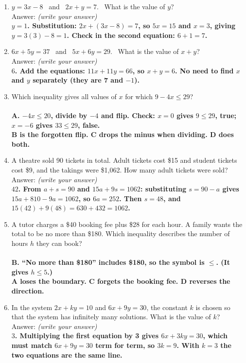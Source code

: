 \documentclass[11pt,a4paper]{article}
\newcommand{\spr}{\\[3pt]\hspace*{6pt}Answer: \underline{\hspace{3.2cm}}\hfill{\footnotesize\itshape(write your answer)}}
\newcommand{\ans}[1]{\ {\color{keyred}\bfseries #1}}
\newcommand{\ans}[1]{}
\begin{document}
\begin{enumerate}[leftmargin=20pt,itemsep=9pt]
\item $y=3x-8$ \ and \ $2x+y=7$. \ What is the value of $y$? \spr
  \ans{\\ $y=1$. Substitution: $2x+(3x-8)=7$, so $5x=15$ and $x=3$, giving $y=3(3)-8=1$. Check in the second equation: $6+1=7$.}

\item $6x+5y=37$ \ and \ $5x+6y=29$. \ What is the value of $x+y$? \spr
  \ans{\\ $6$. Add the equations: $11x+11y=66$, so $x+y=6$. No need to find $x$ and $y$ separately (they are 7 and $-1$).}

\item Which inequality gives all values of $x$ for which $9-4x\le29$?\\
  \ans{\\ A. $-4x\le20$, divide by $-4$ and flip. Check: $x=0$ gives $9\le29$, true; $x=-6$ gives $33\le29$, false. \\ B is the forgotten flip. C drops the minus when dividing. D does both.}

\item A theatre sold 90 tickets in total. Adult tickets cost \$15 and student tickets cost \$9, and the takings were \$1{,}062. How many adult tickets were sold? \spr
  \ans{\\ $42$. From $a+s=90$ and $15a+9s=1062$: substituting $s=90-a$ gives $15a+810-9a=1062$, so $6a=252$. Then $s=48$, and $15(42)+9(48)=630+432=1062$.}

\item A tutor charges a \$40 booking fee plus \$28 for each hour. A family wants the total to be no more than \$180. Which inequality describes the number of hours $h$ they can book?\\
  \ans{\\ B. ``No more than \$180'' includes \$180, so the symbol is $\le$. (It gives $h\le5$.) \\ A loses the boundary. C forgets the booking fee. D reverses the direction.}

\item In the system $2x+ky=10$ and $6x+9y=30$, the constant $k$ is chosen so that the system has infinitely many solutions. What is the value of $k$? \spr
  \ans{\\ $3$. Multiplying the first equation by 3 gives $6x+3ky=30$, which must match $6x+9y=30$ term for term, so $3k=9$. With $k=3$ the two equations are the same line.}

\end{enumerate}
\end{document}
